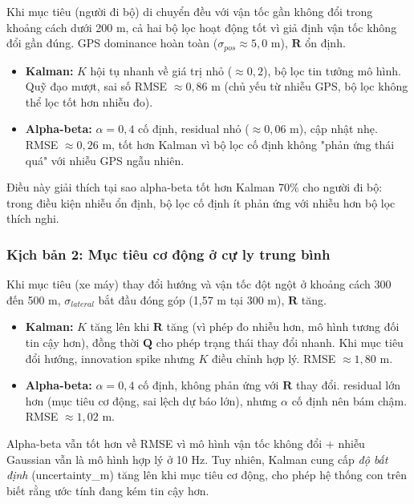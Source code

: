 \hspace{0.5cm} Khi mục tiêu (người đi bộ) di chuyển đều với vận tốc gần không đổi trong khoảng cách dưới 200 m, cả hai bộ lọc hoạt động tốt vì giả định vận tốc không đổi gần đúng. GPS dominance hoàn toàn ($\sigma_{pos} \approx 5{,}0$ m), $\mathbf{R}$ ổn định.

\begin{itemize}
    \item \textbf{Kalman:} $K$ hội tụ nhanh về giá trị nhỏ ($\approx 0{,}2$), bộ lọc tin tưởng mô hình. Quỹ đạo mượt, sai số RMSE $\approx 0{,}86$ m (chủ yếu từ nhiễu GPS, bộ lọc không thể lọc tốt hơn nhiễu đo).
    \item \textbf{Alpha-beta:} $\alpha = 0{,}4$ cố định, residual nhỏ ($\approx 0{,}06$ m), cập nhật nhẹ. RMSE $\approx 0{,}26$ m, tốt hơn Kalman vì bộ lọc cố định không "phản ứng thái quá" với nhiễu GPS ngẫu nhiên.
\end{itemize}

Điều này giải thích tại sao alpha-beta tốt hơn Kalman 70\% cho người đi bộ: trong điều kiện nhiễu ổn định, bộ lọc cố định ít phản ứng với nhiễu hơn bộ lọc thích nghi.

\subsubsection{Kịch bản 2: Mục tiêu cơ động ở cự ly trung bình}

\hspace{0.5cm} Khi mục tiêu (xe máy) thay đổi hướng và vận tốc đột ngột ở khoảng cách 300 đến 500 m, $\sigma_{lateral}$ bắt đầu đóng góp (1,57 m tại 300 m), $\mathbf{R}$ tăng.

\begin{itemize}
    \item \textbf{Kalman:} $K$ tăng lên khi $\mathbf{R}$ tăng (vì phép đo nhiễu hơn, mô hình tương đối tin cậy hơn), đồng thời $\mathbf{Q}$ cho phép trạng thái thay đổi nhanh. Khi mục tiêu đổi hướng, innovation spike nhưng $K$ điều chỉnh hợp lý. RMSE $\approx 1{,}80$ m.
    \item \textbf{Alpha-beta:} $\alpha = 0{,}4$ cố định, không phản ứng với $\mathbf{R}$ thay đổi. residual lớn hơn (mục tiêu cơ động, sai lệch dự báo lớn), nhưng $\alpha$ cố định nên bám chậm. RMSE $\approx 1{,}02$ m.
\end{itemize}

Alpha-beta vẫn tốt hơn về RMSE vì mô hình vận tốc không đổi + nhiễu Gaussian vẫn là mô hình hợp lý ở 10 Hz. Tuy nhiên, Kalman cung cấp \textit{độ bất định} (uncertainty\_m) tăng lên khi mục tiêu cơ động, cho phép hệ thống con trên biết rằng ước tính đang kém tin cậy hơn.

